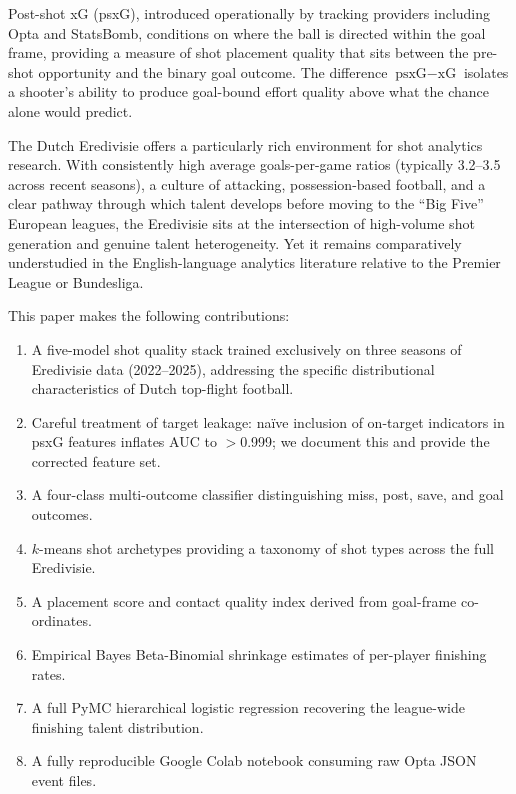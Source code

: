 \documentclass[12pt,a4paper]{article}
\begin{document}
Post-shot xG (psxG), introduced operationally by tracking providers including Opta and StatsBomb, conditions on where the ball is directed within the goal frame, providing a measure of shot placement quality that sits between the pre-shot opportunity and the binary goal outcome. The difference $\text{psxG} - \text{xG}$ isolates a shooter's ability to produce goal-bound effort quality above what the chance alone would predict.

The Dutch Eredivisie offers a particularly rich environment for shot analytics research. With consistently high average goals-per-game ratios (typically 3.2--3.5 across recent seasons), a culture of attacking, possession-based football, and a clear pathway through which talent develops before moving to the ``Big Five'' European leagues, the Eredivisie sits at the intersection of high-volume shot generation and genuine talent heterogeneity. Yet it remains comparatively understudied in the English-language analytics literature relative to the Premier League or Bundesliga.

This paper makes the following contributions:

\begin{enumerate}
    \item A five-model shot quality stack trained exclusively on three seasons of Eredivisie data (2022--2025), addressing the specific distributional characteristics of Dutch top-flight football.
    \item Careful treatment of target leakage: na\"{i}ve inclusion of on-target indicators in psxG features inflates AUC to $>$0.999; we document this and provide the corrected feature set.
    \item A four-class multi-outcome classifier distinguishing miss, post, save, and goal outcomes.
    \item $k$-means shot archetypes providing a taxonomy of shot types across the full Eredivisie.
    \item A placement score and contact quality index derived from goal-frame co-ordinates.
    \item Empirical Bayes Beta-Binomial shrinkage estimates of per-player finishing rates.
    \item A full PyMC hierarchical logistic regression recovering the league-wide finishing talent distribution.
    \item A fully reproducible Google Colab notebook consuming raw Opta JSON event files.
\end{enumerate}
\end{document}
